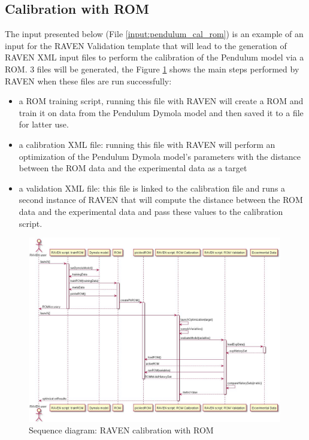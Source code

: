 \documentclass[oneside]{book}
\begin{document}
\subsection{Calibration with ROM}

The input presented below (File \ref{input:pendulum_cal_rom}) is an example of an input for the RAVEN Validation template that will lead to the generation of RAVEN XML input files to perform the calibration of the Pendulum model via a ROM. 3 files will be generated, the Figure \ref{fig:sequence_calibration_w_ROM} shows the main steps performed by RAVEN when these files are run successfully:
\begin{itemize}
    \item a ROM training script, running this file with RAVEN will create a ROM and train it on data from the Pendulum Dymola model and then saved it to a file for latter use. 
    \item a calibration XML file: running this file with RAVEN will perform an optimization of the Pendulum Dymola model's parameters with the distance between the ROM data and the experimental data as a target
    \item a validation XML file: this file is linked to the calibration file and runs a second instance of RAVEN that will compute the distance between the ROM data and the experimental data and pass these values to the calibration script. 
\end{itemize}
\begin{figure}
    \centering
    \includegraphics[width=0.99\textwidth]{pics/sequence_calibration_w_ROM.jpg}
    \caption{Sequence diagram: RAVEN calibration with ROM}
    \label{fig:sequence_calibration_w_ROM}
\end{figure}
\FloatBarrier
\end{document}
